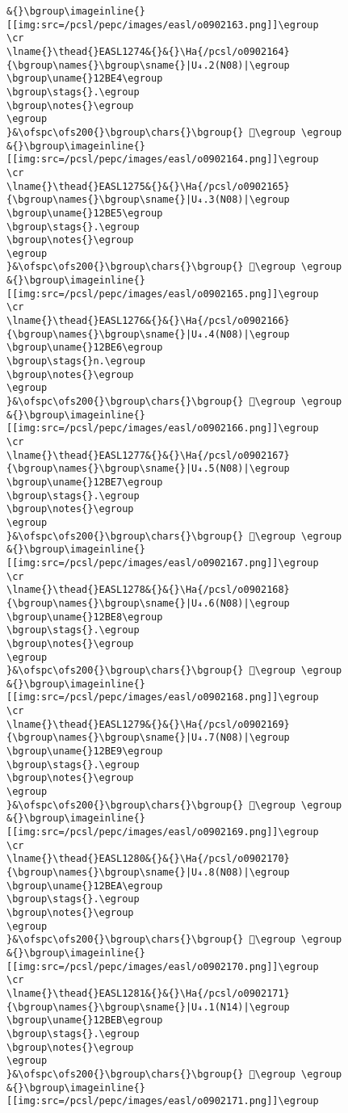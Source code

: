 \begin{verbatim}
&{}\bgroup\imageinline{}[[img:src=/pcsl/pepc/images/easl/o0902163.png]]\egroup
\cr
\lname{}\thead{}EASL1274&{}&{}\Ha{/pcsl/o0902164}{\bgroup\names{}\bgroup\sname{}|U₄.2(N08)|\egroup
\bgroup\uname{}12BE4\egroup
\bgroup\stags{}.\egroup
\bgroup\notes{}\egroup
\egroup
}&\ofspc\ofs200{}\bgroup\chars{}\bgroup{} 𒯤\egroup \egroup
&{}\bgroup\imageinline{}[[img:src=/pcsl/pepc/images/easl/o0902164.png]]\egroup
\cr
\lname{}\thead{}EASL1275&{}&{}\Ha{/pcsl/o0902165}{\bgroup\names{}\bgroup\sname{}|U₄.3(N08)|\egroup
\bgroup\uname{}12BE5\egroup
\bgroup\stags{}.\egroup
\bgroup\notes{}\egroup
\egroup
}&\ofspc\ofs200{}\bgroup\chars{}\bgroup{} 𒯥\egroup \egroup
&{}\bgroup\imageinline{}[[img:src=/pcsl/pepc/images/easl/o0902165.png]]\egroup
\cr
\lname{}\thead{}EASL1276&{}&{}\Ha{/pcsl/o0902166}{\bgroup\names{}\bgroup\sname{}|U₄.4(N08)|\egroup
\bgroup\uname{}12BE6\egroup
\bgroup\stags{}n.\egroup
\bgroup\notes{}\egroup
\egroup
}&\ofspc\ofs200{}\bgroup\chars{}\bgroup{} 𒯦\egroup \egroup
&{}\bgroup\imageinline{}[[img:src=/pcsl/pepc/images/easl/o0902166.png]]\egroup
\cr
\lname{}\thead{}EASL1277&{}&{}\Ha{/pcsl/o0902167}{\bgroup\names{}\bgroup\sname{}|U₄.5(N08)|\egroup
\bgroup\uname{}12BE7\egroup
\bgroup\stags{}.\egroup
\bgroup\notes{}\egroup
\egroup
}&\ofspc\ofs200{}\bgroup\chars{}\bgroup{} 𒯧\egroup \egroup
&{}\bgroup\imageinline{}[[img:src=/pcsl/pepc/images/easl/o0902167.png]]\egroup
\cr
\lname{}\thead{}EASL1278&{}&{}\Ha{/pcsl/o0902168}{\bgroup\names{}\bgroup\sname{}|U₄.6(N08)|\egroup
\bgroup\uname{}12BE8\egroup
\bgroup\stags{}.\egroup
\bgroup\notes{}\egroup
\egroup
}&\ofspc\ofs200{}\bgroup\chars{}\bgroup{} 𒯨\egroup \egroup
&{}\bgroup\imageinline{}[[img:src=/pcsl/pepc/images/easl/o0902168.png]]\egroup
\cr
\lname{}\thead{}EASL1279&{}&{}\Ha{/pcsl/o0902169}{\bgroup\names{}\bgroup\sname{}|U₄.7(N08)|\egroup
\bgroup\uname{}12BE9\egroup
\bgroup\stags{}.\egroup
\bgroup\notes{}\egroup
\egroup
}&\ofspc\ofs200{}\bgroup\chars{}\bgroup{} 𒯩\egroup \egroup
&{}\bgroup\imageinline{}[[img:src=/pcsl/pepc/images/easl/o0902169.png]]\egroup
\cr
\lname{}\thead{}EASL1280&{}&{}\Ha{/pcsl/o0902170}{\bgroup\names{}\bgroup\sname{}|U₄.8(N08)|\egroup
\bgroup\uname{}12BEA\egroup
\bgroup\stags{}.\egroup
\bgroup\notes{}\egroup
\egroup
}&\ofspc\ofs200{}\bgroup\chars{}\bgroup{} 𒯪\egroup \egroup
&{}\bgroup\imageinline{}[[img:src=/pcsl/pepc/images/easl/o0902170.png]]\egroup
\cr
\lname{}\thead{}EASL1281&{}&{}\Ha{/pcsl/o0902171}{\bgroup\names{}\bgroup\sname{}|U₄.1(N14)|\egroup
\bgroup\uname{}12BEB\egroup
\bgroup\stags{}.\egroup
\bgroup\notes{}\egroup
\egroup
}&\ofspc\ofs200{}\bgroup\chars{}\bgroup{} 𒯫\egroup \egroup
&{}\bgroup\imageinline{}[[img:src=/pcsl/pepc/images/easl/o0902171.png]]\egroup

\end{verbatim}
